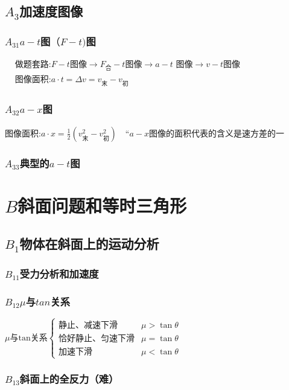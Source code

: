 \documentclass[lang=cn,10pt]{elegantbook}
\begin{document}
	\subsection{$A_3$加速度图像}
	\subsubsection{$A_{31}$$a-t$图$（F-t)$图}
$	\begin{aligned}&\text{做题套路:}F-t\text{图像}\to F_\text{合}-t\text{图像}\to a-t\text{ 图像}\to v-t\text{图像}\\&\text{图像面积:}a\cdot t=\Delta v=v_\text{末}-v_\text{初}\end{aligned}$
    \subsubsection{$A_{32}$$a-x$图}
    $\text{图像面积:}a\cdot x=\frac12(v_\text{末}^2-v_\text{初}^2)\quad“a-x\text{图像的面积代表的含义是速方差的一}$
    \subsubsection{$A_{33}$典型的$a-t$图}
    \vspace{3cm}
    \section{$B$斜面问题和等时三角形}
    \subsection{$B_{1}$物体在斜面上的运动分析}
    \subsubsection{$B_{11}$受力分析和加速度}
    \vspace{3cm}
    \subsubsection{$B_{12}$$\mu$与$tan$关系}
    $\mu\text{与tan关系}\left\{\begin{array}{ll}\text{静止、减速下滑}&\mu>\tan\theta\\\text{恰好静止、匀速下滑}&\mu=\tan\theta\\\text{加速下滑}&\mu<\tan\theta\end{array}\right.$
    \subsubsection{$B_{13}$斜面上的全反力（难）}
    \vspace{2cm}
\end{document}
